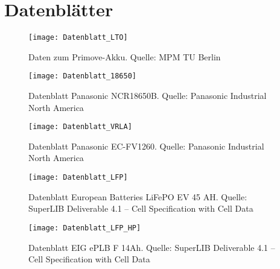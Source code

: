 \appendix
\label{an_Datenblaetter}
\chapter{Datenblätter}
\begin{figure}[h!]\centering
	\texttt{[image: Datenblatt\_LTO]}
	\caption[Daten zum Primove-Akku]{Daten zum Primove-Akku. Quelle: MPM TU Berlin}
\end{figure}

\begin{figure}\centering
	\texttt{[image: Datenblatt\_18650]}
	\caption[Datenblatt Panasonic NCR18650B]{Datenblatt Panasonic NCR18650B. Quelle: Panasonic Industrial North America}
\end{figure}

\begin{figure}\centering
	\texttt{[image: Datenblatt\_VRLA]}
	\caption[Datenblatt Panasonic EC-FV1260]{Datenblatt Panasonic EC-FV1260. Quelle: Panasonic Industrial North America}
\end{figure}

\begin{figure}\centering
	\texttt{[image: Datenblatt\_LFP]}
	\caption[Datenblatt European Batteries LiFePO EV 45 AH]{Datenblatt European Batteries LiFePO EV 45 AH. Quelle: SuperLIB Deliverable 4.1 – Cell Specification with Cell Data}
\end{figure}

\begin{figure}\centering
	\texttt{[image: Datenblatt\_LFP\_HP]}
	\caption[Datenblatt EIG ePLB F 14Ah]{Datenblatt EIG ePLB F 14Ah. Quelle: SuperLIB Deliverable 4.1 – Cell Specification with Cell Data}
\end{figure}